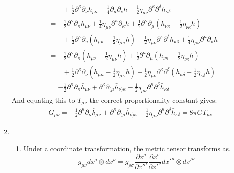 \documentclass[12pt,a4]{article}
\begin{document}
\begin{enumerate}
\begin{align*}
                  & \qquad + \frac{1}{2}\partial^\kappa \partial_{\nu} h_{\mu\kappa} - \frac{1}{4}\partial_\mu \partial_{\nu}h - \frac{1}{2}\eta_{\mu\nu} \partial^\kappa \partial^\delta h_{\kappa\delta}\\
                  &= -\frac{1}{2}\partial^\kappa\partial_\kappa h_{\mu\nu} + \frac{1}{4}\eta_{\mu\nu}\partial^\kappa\partial_\kappa h + \frac{1}{2}\partial^\kappa \partial_{\mu} (h_{\nu\kappa} - \frac{1}{2}\eta_{\nu\kappa}h)\\
                  & \qquad + \frac{1}{2}\partial^\kappa \partial_{\nu} (h_{\mu\kappa} - \frac{1}{2}\eta_{\mu\kappa}h) - \frac{1}{2}\eta_{\mu\nu} \partial^\kappa \partial^\delta h_{\kappa\delta} + \frac{1}{4} \eta_{\mu\nu} \partial^\kappa \partial_\kappa h\\
                  &= -\frac{1}{2}\partial^\kappa\partial_\kappa( h_{\mu\nu} - \frac{1}{2}\eta_{\mu\nu} h) + \frac{1}{2}\partial^\kappa \partial_{\mu} (h_{\nu\kappa} - \frac{1}{2}\eta_{\nu\kappa}h)\\
                  & \qquad + \frac{1}{2}\partial^\kappa \partial_{\nu} (h_{\mu\kappa} - \frac{1}{2}\eta_{\mu\kappa}h) - \frac{1}{2}\eta_{\mu\nu} \partial^\kappa \partial^\delta (h_{\kappa\delta} - \frac{1}{2}\eta_{\kappa\delta}h)\\
                  &= -\frac{1}{2}\partial^\kappa \partial_\kappa \bar{h}_{\mu\nu} + \partial^\kappa \partial_{(\mu} \bar{h}_{\nu)\kappa} - \frac{1}{2}\eta_{\mu\nu} \partial^\kappa \partial^\delta \bar{h}_{\kappa\delta}
    \end{align*}
    And equating this to $T_{\mu\nu}$ the correct proportionality constant gives:
    \begin{align*}
      G_{\mu\nu} = -\frac{1}{2}\partial^\kappa \partial_\kappa \bar{h}_{\mu\nu} + \partial^\kappa \partial_{(\mu} \bar{h}_{\nu)\kappa} - \frac{1}{2}\eta_{\mu\nu} \partial^\kappa \partial^\delta \bar{h}_{\kappa\delta} = 8 \pi G T_{\mu\nu}
    \end{align*}
  \item
    \begin{enumerate}
      \item 
        Under a coordinate transformation, the metric tensor transforms as.
        \begin{equation*}
          g_{\mu\nu} dx^\mu \otimes dx^\nu = g_{\rho \sigma} \frac{\partial x^\rho}{\partial x'^\mu} \frac{\partial x^\sigma}{\partial x'^\nu} dx'^\mu \otimes dx'^\nu

\end{equation*}
\end{enumerate}
\end{enumerate}
\end{document}
